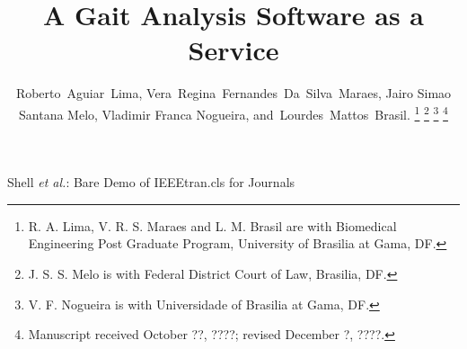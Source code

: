 \documentclass[journal]{IEEEtran}
\begin{document}
%
\title{A Gait Analysis Software as a Service}
%
%
%

\author{
	Roberto~Aguiar~Lima,
	Vera~Regina~Fernandes~Da~Silva~Maraes,
	Jairo Simao Santana Melo,
	Vladimir Franca Nogueira,
        and~Lourdes~Mattos~Brasil.
	\thanks{R. A. Lima, V. R. S. Maraes and L. M. Brasil are with Biomedical Engineering Post Graduate Program, University of Brasilia at Gama, DF.}
	\thanks{J. S. S. Melo is with Federal District Court of Law, Brasilia, DF.}
	\thanks{V. F. Nogueira is with Universidade of Brasilia at Gama, DF.}
	\thanks{Manuscript received October ??, ????; revised December ?, ????.}
}


% 
%



%
{Shell \MakeLowercase{\textit{et al.}}: Bare Demo of IEEEtran.cls for Journals}
% 
\end{document}
